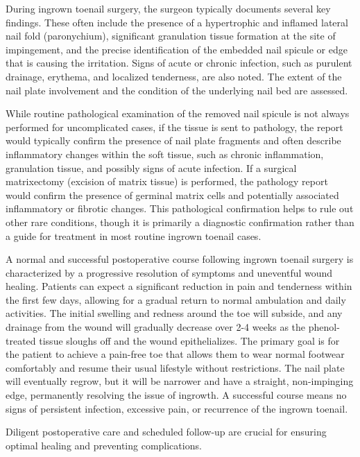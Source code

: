 During ingrown toenail surgery, the surgeon typically documents several key findings. These often include the presence of a hypertrophic and inflamed lateral nail fold (paronychium), significant granulation tissue formation at the site of impingement, and the precise identification of the embedded nail spicule or edge that is causing the irritation. Signs of acute or chronic infection, such as purulent drainage, erythema, and localized tenderness, are also noted. The extent of the nail plate involvement and the condition of the underlying nail bed are assessed.

While routine pathological examination of the removed nail spicule is not always performed for uncomplicated cases, if the tissue is sent to pathology, the report would typically confirm the presence of nail plate fragments and often describe inflammatory changes within the soft tissue, such as chronic inflammation, granulation tissue, and possibly signs of acute infection. If a surgical matrixectomy (excision of matrix tissue) is performed, the pathology report would confirm the presence of germinal matrix cells and potentially associated inflammatory or fibrotic changes. This pathological confirmation helps to rule out other rare conditions, though it is primarily a diagnostic confirmation rather than a guide for treatment in most routine ingrown toenail cases.

A normal and successful postoperative course following ingrown toenail surgery is characterized by a progressive resolution of symptoms and uneventful wound healing. Patients can expect a significant reduction in pain and tenderness within the first few days, allowing for a gradual return to normal ambulation and daily activities. The initial swelling and redness around the toe will subside, and any drainage from the wound will gradually decrease over 2-4 weeks as the phenol-treated tissue sloughs off and the wound epithelializes. The primary goal is for the patient to achieve a pain-free toe that allows them to wear normal footwear comfortably and resume their usual lifestyle without restrictions. The nail plate will eventually regrow, but it will be narrower and have a straight, non-impinging edge, permanently resolving the issue of ingrowth. A successful course means no signs of persistent infection, excessive pain, or recurrence of the ingrown toenail.

Diligent postoperative care and scheduled follow-up are crucial for ensuring optimal healing and preventing complications.

